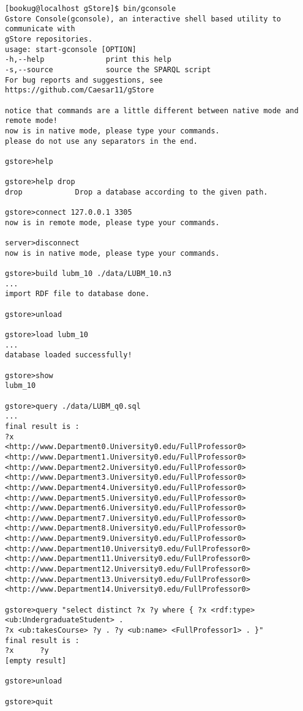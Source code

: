 \documentclass[titlepage, a4paper, 12pt]{article}
\begin{document}
\begin{verbatim}
[bookug@localhost gStore]$ bin/gconsole
Gstore Console(gconsole), an interactive shell based utility to communicate with
gStore repositories.
usage: start-gconsole [OPTION]
-h,--help              print this help
-s,--source            source the SPARQL script
For bug reports and suggestions, see https://github.com/Caesar11/gStore

notice that commands are a little different between native mode and remote mode!
now is in native mode, please type your commands.
please do not use any separators in the end.

gstore>help

gstore>help drop
drop            Drop a database according to the given path.

gstore>connect 127.0.0.1 3305
now is in remote mode, please type your commands.

server>disconnect
now is in native mode, please type your commands.

gstore>build lubm_10 ./data/LUBM_10.n3
...
import RDF file to database done.

gstore>unload

gstore>load lubm_10
...
database loaded successfully!

gstore>show
lubm_10

gstore>query ./data/LUBM_q0.sql
...
final result is :
?x
<http://www.Department0.University0.edu/FullProfessor0>
<http://www.Department1.University0.edu/FullProfessor0>
<http://www.Department2.University0.edu/FullProfessor0>
<http://www.Department3.University0.edu/FullProfessor0>
<http://www.Department4.University0.edu/FullProfessor0>
<http://www.Department5.University0.edu/FullProfessor0>
<http://www.Department6.University0.edu/FullProfessor0>
<http://www.Department7.University0.edu/FullProfessor0>
<http://www.Department8.University0.edu/FullProfessor0>
<http://www.Department9.University0.edu/FullProfessor0>
<http://www.Department10.University0.edu/FullProfessor0>
<http://www.Department11.University0.edu/FullProfessor0>
<http://www.Department12.University0.edu/FullProfessor0>
<http://www.Department13.University0.edu/FullProfessor0>
<http://www.Department14.University0.edu/FullProfessor0>

gstore>query "select distinct ?x ?y where { ?x <rdf:type>
<ub:UndergraduateStudent> .
?x <ub:takesCourse> ?y . ?y <ub:name> <FullProfessor1> . }"
final result is :
?x      ?y
[empty result]

gstore>unload

gstore>quit
\end{verbatim}
\end{document}
